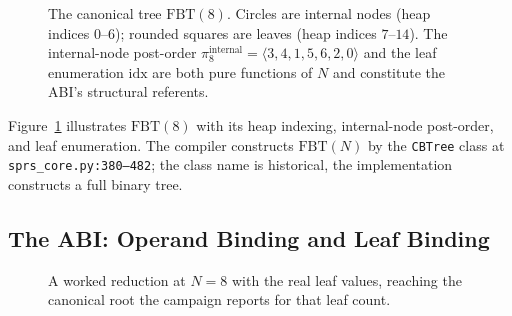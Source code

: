 \documentclass[journal,10pt]{IEEEtran}
\theoremstyle{plain}
\theoremstyle{definition}
\theoremstyle{remark}
\newcommand{\FBT}{\ensuremath{\mathrm{FBT}}}
\newcommand{\sv}[1]{\texttt{#1}}
\begin{document}
\begin{figure}[!t]
\centering
{}
\caption{The canonical tree $\FBT(8)$. Circles are internal nodes
  (heap indices $0$--$6$); rounded squares are leaves (heap indices
  $7$--$14$). The internal-node post-order
  $\pi_8^{\text{internal}} = \langle 3,4,1,5,6,2,0\rangle$ and the
  leaf enumeration $\mathrm{idx}$ are both pure functions of $N$ and
  constitute the ABI's structural referents.}
\label{fig:fbt}
\end{figure}

Figure~\ref{fig:fbt} illustrates $\FBT(8)$ with its heap indexing,
internal-node post-order, and leaf enumeration. The compiler constructs
$\FBT(N)$ by the \sv{CBTree} class at \sv{sprs\_core.py:380--482}; the
class name is historical, the implementation constructs a full binary
tree.

\subsection{The ABI: Operand Binding and Leaf Binding}\label{sec:abi-def}

\begin{figure}[!t]\centering

\caption{A worked reduction at $N{=}8$ with the real leaf values, reaching the canonical root the campaign reports for that leaf count.}\label{fig:worked}
\end{figure}
\end{document}
